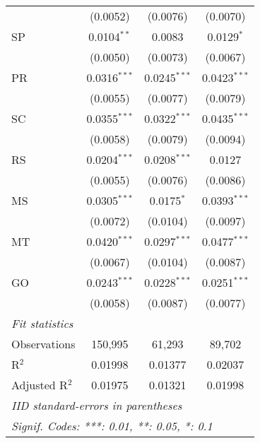 \begin{tabular}{lccc}
                   & (0.0052)                & (0.0076)                & (0.0070)\\   
   SP              & 0.0104$^{**}$           & 0.0083                  & 0.0129$^{*}$\\   
                   & (0.0050)                & (0.0073)                & (0.0067)\\   
   PR              & 0.0316$^{***}$          & 0.0245$^{***}$          & 0.0423$^{***}$\\   
                   & (0.0055)                & (0.0077)                & (0.0079)\\   
   SC              & 0.0355$^{***}$          & 0.0322$^{***}$          & 0.0435$^{***}$\\   
                   & (0.0058)                & (0.0079)                & (0.0094)\\   
   RS              & 0.0204$^{***}$          & 0.0208$^{***}$          & 0.0127\\   
                   & (0.0055)                & (0.0076)                & (0.0086)\\   
   MS              & 0.0305$^{***}$          & 0.0175$^{*}$            & 0.0393$^{***}$\\   
                   & (0.0072)                & (0.0104)                & (0.0097)\\   
   MT              & 0.0420$^{***}$          & 0.0297$^{***}$          & 0.0477$^{***}$\\   
                   & (0.0067)                & (0.0104)                & (0.0087)\\   
   GO              & 0.0243$^{***}$          & 0.0228$^{***}$          & 0.0251$^{***}$\\   
                   & (0.0058)                & (0.0087)                & (0.0077)\\   
   \midrule
   \emph{Fit statistics}\\
   Observations    & 150,995                 & 61,293                  & 89,702\\  
   R$^2$           & 0.01998                 & 0.01377                 & 0.02037\\  
   Adjusted R$^2$  & 0.01975                 & 0.01321                 & 0.01998\\  
   \midrule \midrule
   \multicolumn{4}{l}{\emph{IID standard-errors in parentheses}}\\
   \multicolumn{4}{l}{\emph{Signif. Codes: ***: 0.01, **: 0.05, *: 0.1}}\\
\end{tabular}
\par\endgroup


